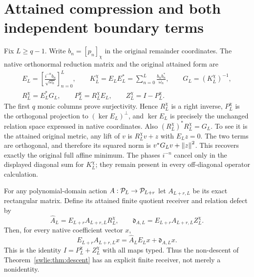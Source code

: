\section{Attained compression and both independent boundary terms}

Fix $L\geq q-1$. Write $b_n=[p_n]_\chi$ in the original
remainder coordinates. The native orthonormal reduction
matrix and the original attained form are
\begin{equation}\label{swlie:eq:finitequotient}
 \begin{gathered}
 E_L=\left[\frac{i^{-n}b_n}{\sqrt{\omega_n}}\right]_{n=0}^L,
 \qquad K_L^\chi=E_LE_L^*
           =\sum_{n=0}^L\frac{b_nb_n^*}{\omega_n},
 \qquad G_L=(K_L^\chi)^{-1},\\
 R_L^\chi=E_L^*G_L,\qquad
 P_L^\chi=R_L^\chi E_L,\qquad Z_L^\chi=I-P_L^\chi.
 \end{gathered}
\end{equation}
The first $q$ monic columns prove surjectivity.
Hence $R_L^\chi$ is a right inverse, $P_L^\chi$
is the orthogonal projection to $(\ker E_L)^\perp$,
and $\ker E_L$ is precisely the unchanged relation
space expressed in native coordinates.
Also $(R_L^\chi)^*R_L^\chi=G_L$.
To see it is the attained original metric, any lift
of $v$ is $R_L^\chi v+z$ with $E_Lz=0$.
The two terms are orthogonal, and therefore its
squared norm is $v^*G_Lv+\left\lVert z\right\rVert^2$.
This recovers exactly the original full affine minimum.
The phases $i^{-n}$ cancel only in the displayed
diagonal sum for $K_L^\chi$; they remain present
in every off-diagonal operator calculation.

For any polynomial-domain action $A:\mathcal P_L\to\mathcal P_{L+r}$
let $A_{L+r,L}$ be its exact rectangular matrix.
Define its attained finite quotient receiver and relation
defect by
\begin{equation}\label{swlie:eq:generalreceiver}
 \widehat A_L=E_{L+r}A_{L+r,L}R_L^\chi,\qquad
 \mathfrak d_{A,L}=E_{L+r}A_{L+r,L}Z_L^\chi.
\end{equation}
Then, for every native coefficient vector $x$,
\begin{equation}\label{swlie:eq:relationidentity}
 E_{L+r}A_{L+r,L}x
        =\widehat A_LE_Lx+\mathfrak d_{A,L}x.
\end{equation}
This is the identity $I=P_L^\chi+Z_L^\chi$ with
all maps typed. Thus the non-descent of
Theorem~\ref{swlie:thm:descent} has an explicit finite receiver,
not merely a nonidentity.

